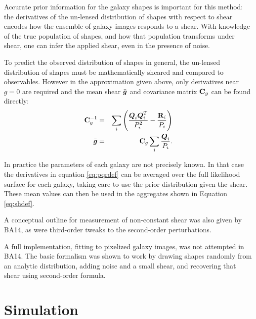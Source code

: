 \documentclass[usegraphicx,usenatbib]{mn2e}
\newcommand{\vecg}{\mbox{\boldmath $g$}}
\newcommand{\vecD}{\mbox{\boldmath $D$}}
\newcommand{\vecQ}{\mbox{\boldmath $Q$}}
\newcommand{\matR}{\mbox{$\bf R$}}
\newcommand{\matC}{\mbox{$\bf C$}}
\newcommand{\bnabg}{ \boldsymbol{\nabla_g}}
\begin{document}
Accurate prior information for the galaxy shapes is important for this method:
the derivatives of the un-lensed distribution of shapes with respect to shear
encodes how the ensemble of galaxy images responds to a shear. With knowledge of
the true population of shapes, and how that population transforms under shear,
one can infer the applied shear, even in the presence of noise.

To predict the observed distribution of shapes in general, the un-lensed
distribution of shapes must be mathematically sheared and compared to
observables.  However in the approximation given above, only derivatives near
$g=0$ are required and the mean shear $\bar{\vecg}$ and covariance matrix
$\matC_g$ can be found directly:
\begin{eqnarray}
\matC_g^{-1} & = & \sum_i \left(\frac{\vecQ_i \vecQ^T_i}{P_i^2} - \frac{\matR_i}{P_i}\right) \label{eq:cdef} \nonumber \\
\bar{\vecg} & = &  \matC_g \sum_i \frac{\vecQ_i}{P_i}. \label{eq:shdef}
\end{eqnarray}

In practice the parameters of each galaxy are not precisely known. In that case
the derivatives in equation \ref{eq:pqrdef} can be averaged over the full
likelihood surface for each galaxy, taking care to use the prior
distribution given the shear.  These mean values can then be used in the
aggregates shown in Equation \ref{eq:shdef}.

A conceptual outline for measurement of non-constant shear was also given by
BA14, as were third-order tweaks to the second-order perturbations.

A full implementation, fitting to pixelized galaxy images, was not attempted in
BA14.  The basic formalism was shown to work by drawing shapes randomly from an
analytic distribution, adding noise and a small shear, and recovering that shear
using second-order formula.

\section{Simulation} \label{sec:sim}
\end{document}
